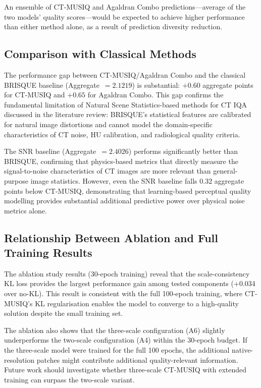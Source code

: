 An ensemble of CT-MUSIQ and Agaldran Combo predictions---average of the two models'
quality scores---would be expected to achieve higher performance than either method alone,
as a result of prediction diversity reduction.

\subsection{Comparison with Classical Methods}

The performance gap between CT-MUSIQ/Agaldran Combo and the classical BRISQUE baseline
(Aggregate~$= 2.1219$) is substantial: $+0.60$ aggregate points for CT-MUSIQ and
$+0.65$ for Agaldran Combo. This gap confirms the fundamental limitation of Natural
Scene Statistics-based methods for CT IQA discussed in the literature review: BRISQUE's
statistical features are calibrated for natural image distortions and cannot model the
domain-specific characteristics of CT noise, HU calibration, and radiological quality
criteria.

The SNR baseline (Aggregate~$= 2.4026$) performs significantly better than BRISQUE,
confirming that physics-based metrics that directly measure the signal-to-noise
characteristics of CT images are more relevant than general-purpose image statistics.
However, even the SNR baseline falls 0.32 aggregate points below CT-MUSIQ, demonstrating
that learning-based perceptual quality modelling provides substantial additional
predictive power over physical noise metrics alone.

\subsection{Relationship Between Ablation and Full Training Results}

The ablation study results (30-epoch training) reveal that the scale-consistency KL loss
provides the largest performance gain among tested components (+0.034 over no-KL). This
result is consistent with the full 100-epoch training, where CT-MUSIQ's KL regularisation
enables the model to converge to a high-quality solution despite the small training set.

The ablation also shows that the three-scale configuration (A6) slightly underperforms
the two-scale configuration (A4) within the 30-epoch budget. If the three-scale model
were trained for the full 100 epochs, the additional native-resolution patches might
contribute additional quality-relevant information. Future work should investigate whether
three-scale CT-MUSIQ with extended training can surpass the two-scale variant.


